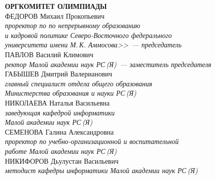 \newpage
\noindent
\textbf{ОРГКОМИТЕТ ОЛИМПИАДЫ}
\\[2mm]
ФЕДОРОВ Михаил Прокопьевич\\ 
\textit{проректор по по непрерывному образованию \\
и кадровой политике Северо-Восточного федерального \\
университета имени М.\,К. Аммосова>>~--- председатель}
\\[2mm]
ПАВЛОВ Василий Климович  \\
\textit{ректор Малой академии наук РС\,(Я)~--- 
заместитель председателя}
\\[2mm]
ГАБЫШЕВ Дмитрий Валерианович
\\
\textit{главный специалист отдела общего образования\\
 Министерства образования и науки РС\,(Я)}
\\[2mm]
НИКОЛАЕВА Наталья Васильевна \\
\textit
{заведующая кафедрой информатики \\
Малой академии наук РС\,(Я)}
\\[2mm]
СЕМЕНОВА Галина Александровна \\
\textit
{проректор по учебно-организационной и воспитательной\\ 
работе Малой академии наук РС\,(Я)} 
\\[2mm]
НИКИФОРОВ Дьулустан Васильевич \\
\textit{методист кафедры информатики Малой академии наук РС\,(Я)}
\\[2mm]

\newpage

